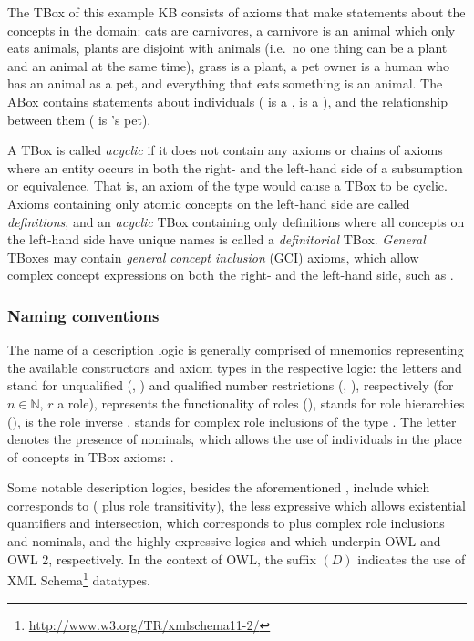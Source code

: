 The TBox of this example KB consists of axioms that make statements about the concepts in the domain: cats are carnivores, a carnivore is an animal which only eats animals, plants are disjoint with animals (i.e.\ no one thing can be a plant and an animal at the same time), grass is a plant, a pet owner is a human who has an animal as a pet, and everything that eats something is an animal. The ABox contains statements about individuals ( is a ,  is a ), and the relationship between them ( is 's pet).

A TBox is called \emph{acyclic} if it does not contain any axioms or chains of axioms where an entity occurs in both the right- and the left-hand side of a subsumption or equivalence. That is, an axiom of the type  would cause a TBox to be cyclic. Axioms containing only atomic concepts on the left-hand side are called \emph{definitions}, and an \emph{acyclic} TBox containing only definitions where all concepts on the left-hand side have unique names is called a \emph{definitorial} TBox. \emph{General} TBoxes may contain \emph{general concept inclusion} (GCI) axioms, which allow complex concept expressions on both the right- and the left-hand side, such as .


\subsubsection{Naming conventions}

The name of a description logic is generally comprised of mnemonics representing the available constructors and axiom types in the respective logic: the letters  and  stand for unqualified (, ) and qualified number restrictions (, ), respectively (for $n \in \mathbb{N}$, $r$ a role),  represents the functionality of roles (),  stands for role hierarchies (),  is the role inverse ,  stands for complex role inclusions of the type . The letter  denotes the presence of nominals, which allows the use of individuals in the place of concepts in TBox axioms: . 

Some notable description logics, besides the aforementioned , include  \cite{horrocks99wq} which corresponds to  ( plus role transitivity), the less expressive  \cite{brandt04ub} which allows existential quantifiers and intersection, \elplusplus \cite{baader05aj} which corresponds to  plus complex role inclusions and nominals, and the highly expressive logics  \cite{horrocks03vn} and  \cite{horrocks06ya} which underpin OWL and OWL 2, respectively. In the context of OWL, the suffix $(D)$ indicates the use of XML Schema\footnote{\url{http://www.w3.org/TR/xmlschema11-2/}} datatypes.


